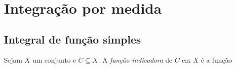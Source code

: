 \chapter{Integração por medida}

\section{Integral de função simples}

\begin{defi}
Sejam $X$ um conjunto e $C \subseteq X$. A \emph{função indicadora} de $C$ em $X$ é a função 
\end{defi}

